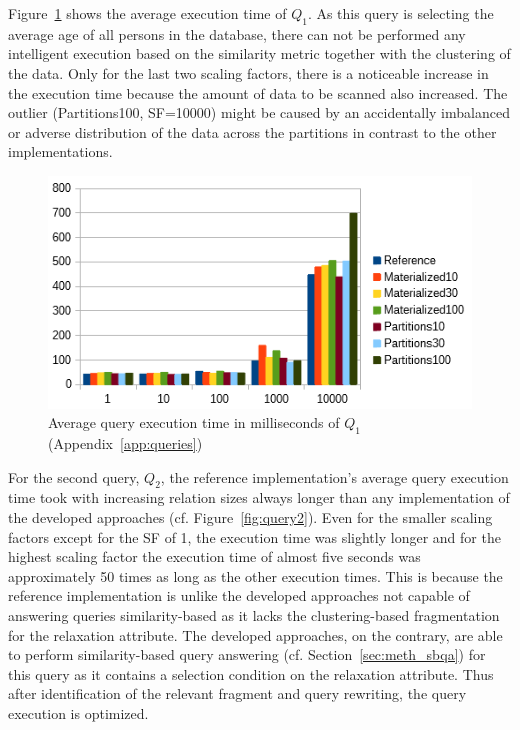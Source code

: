 Figure~\ref{fig:query1} shows the average execution time of $Q_1$. As this query is selecting the average age of all persons in the database, 
there can not be performed any intelligent execution based on the similarity metric together with the clustering of the data. Only for the last two scaling
factors, there is a noticeable increase in the execution time because the amount of data to be scanned also increased. The outlier (Partitions100, SF=10000)
might be caused by an accidentally imbalanced or adverse distribution of the data across the partitions in contrast to the other implementations.
\begin{figure}[h]
    \centering
    \includegraphics[scale=0.8]{charts/Query1.png}
    \caption{Average query execution time in milliseconds of $Q_1$ (Appendix~\ref{app:queries})}
    \label{fig:query1}
\end{figure}

For the second query, $Q_2$, the reference implementation's average query execution time took with increasing relation sizes always longer than any
implementation of the developed approaches (cf. Figure~\ref{fig:query2}). Even for the smaller scaling factors except for the SF of 1, the execution time was
slightly longer and for the highest scaling factor the execution time of almost five seconds was approximately 50 times as long as the other execution times.
This is because the reference implementation is unlike the developed approaches not capable of answering queries similarity-based as it lacks the
clustering-based fragmentation for the relaxation attribute. The developed approaches, on the contrary, are able to perform similarity-based query answering 
(cf. Section~\ref{sec:meth_sbqa}) for this query as it contains a selection condition on the relaxation attribute. Thus after identification of the relevant
fragment and query rewriting, the query execution is optimized.

